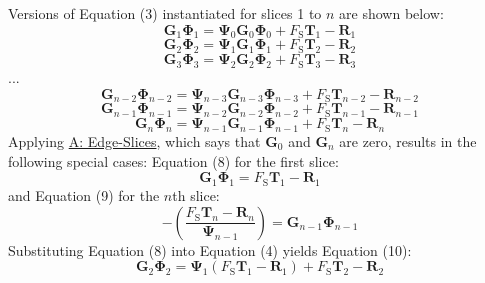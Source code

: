 \documentclass[12pt]{article}
\begin{document}
Versions of Equation (3) instantiated for slices 1 to $n$ are shown below:
\begin{displaymath}
{\mathbf{G}}_{1} {\mathbf{Φ}}_{1}={\mathbf{Ψ}}_{0} {\mathbf{G}}_{0} {\mathbf{Φ}}_{0}+{F_{\text{S}}} {\mathbf{T}}_{1}-{\mathbf{R}}_{1}
\end{displaymath}
\begin{displaymath}
{\mathbf{G}}_{2} {\mathbf{Φ}}_{2}={\mathbf{Ψ}}_{1} {\mathbf{G}}_{1} {\mathbf{Φ}}_{1}+{F_{\text{S}}} {\mathbf{T}}_{2}-{\mathbf{R}}_{2}
\end{displaymath}
\begin{displaymath}
{\mathbf{G}}_{3} {\mathbf{Φ}}_{3}={\mathbf{Ψ}}_{2} {\mathbf{G}}_{2} {\mathbf{Φ}}_{2}+{F_{\text{S}}} {\mathbf{T}}_{3}-{\mathbf{R}}_{3}
\end{displaymath}
...
\begin{displaymath}
{\mathbf{G}}_{n-2} {\mathbf{Φ}}_{n-2}={\mathbf{Ψ}}_{n-3} {\mathbf{G}}_{n-3} {\mathbf{Φ}}_{n-3}+{F_{\text{S}}} {\mathbf{T}}_{n-2}-{\mathbf{R}}_{n-2}
\end{displaymath}
\begin{displaymath}
{\mathbf{G}}_{n-1} {\mathbf{Φ}}_{n-1}={\mathbf{Ψ}}_{n-2} {\mathbf{G}}_{n-2} {\mathbf{Φ}}_{n-2}+{F_{\text{S}}} {\mathbf{T}}_{n-1}-{\mathbf{R}}_{n-1}
\end{displaymath}
\begin{displaymath}
{\mathbf{G}}_{n} {\mathbf{Φ}}_{n}={\mathbf{Ψ}}_{n-1} {\mathbf{G}}_{n-1} {\mathbf{Φ}}_{n-1}+{F_{\text{S}}} {\mathbf{T}}_{n}-{\mathbf{R}}_{n}
\end{displaymath}
Applying \hyperref[assumpES]{A: Edge-Slices}, which says that ${\mathbf{G}}_{0}$ and ${\mathbf{G}}_{n}$ are zero, results in the following special cases: Equation (8) for the first slice:
\begin{displaymath}
{\mathbf{G}}_{1} {\mathbf{Φ}}_{1}={F_{\text{S}}} {\mathbf{T}}_{1}-{\mathbf{R}}_{1}
\end{displaymath}
and Equation (9) for the $n$th slice:
\begin{displaymath}
-\left(\frac{{F_{\text{S}}} {\mathbf{T}}_{n}-{\mathbf{R}}_{n}}{{\mathbf{Ψ}}_{n-1}}\right)={\mathbf{G}}_{n-1} {\mathbf{Φ}}_{n-1}
\end{displaymath}
Substituting Equation (8) into Equation (4) yields Equation (10):
\begin{displaymath}
{\mathbf{G}}_{2} {\mathbf{Φ}}_{2}={\mathbf{Ψ}}_{1} \left({F_{\text{S}}} {\mathbf{T}}_{1}-{\mathbf{R}}_{1}\right)+{F_{\text{S}}} {\mathbf{T}}_{2}-{\mathbf{R}}_{2}
\end{displaymath}
\end{document}
